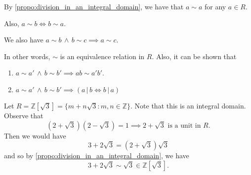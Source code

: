 \begin{note}
  By \cref{propo:division_in_an_integral_domain}, we have that $a \sim a$ for any $a \in R$.

  \noindent Also, $a \sim b \iff b \sim a$.

  \noindent We also have $a \sim b \, \land \, b \sim c \implies a \sim c$.
  
  In other words, $\sim$ is an equivalence relation in $R$. Also, it can be shown that
  \begin{enumerate}
    \item $a \sim a' \, \land \, b \sim b' \implies ab \sim a' b'$.
    \item $a \sim a' \, \land \, b \sim b' \implies ( a \, | \, b \iff b \, | \, a )$
  \end{enumerate}
\end{note}

\begin{eg}
  Let $R = \mathbb{Z}[\sqrt{3}] = \{ m + n \sqrt{3} : m, n \in \mathbb{Z} \}$. Note that this is an integral domain. Observe that
  \begin{equation*}
    (2 + \sqrt{3})(2 - \sqrt{3}) = 1 \implies 2 + \sqrt{3} \text{ is a unit in } R.
  \end{equation*}
  Then we would have
  \begin{equation*}
    3 + 2 \sqrt{3} = (2 + \sqrt{3}) \sqrt{3}
  \end{equation*}
  and so by \cref{propo:division_in_an_integral_domain}, we have
  \begin{equation*}
    3 + 2 \sqrt{3} \sim \sqrt{3} \in \mathbb{Z}[\sqrt{3}].
  \end{equation*}
\end{eg}



